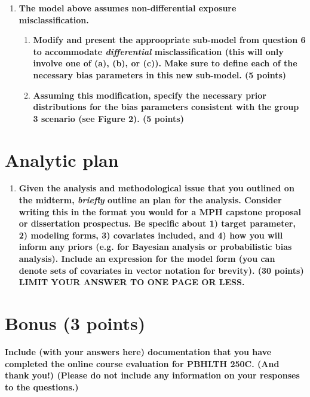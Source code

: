 \documentclass[
  11pt,
]{article}
\begin{document}
\begin{enumerate}[label=\textbf{\arabic*.}]
\newpage

  \item \textbf{The model above assumes non-differential exposure misclassification.}
  \begin{enumerate}[label=\textbf{\alph*.}]
    \item \textbf{Modify and present the approopriate sub-model from question 6 to accommodate \textit{differential} misclassification (this will only involve one of (a), (b), or (c)). Make sure to define each of the necessary bias parameters in this new sub-model. (5 points)}
    \item \textbf{Assuming this modification, specify the necessary prior distributions for the bias parameters consistent with the group 3 scenario (see Figure 2). (5 points)}
  \end{enumerate}
\end{enumerate}

\newpage

\section{Analytic plan}

\begin{enumerate}[label=\textbf{\arabic*.}]\addtocounter{enumi}{8}

  \item \textbf{Given the analysis and methodological issue that you outlined on the midterm, \textit{briefly} outline an plan for the analysis. Consider writing this in the format you would for a MPH capstone proposal or dissertation prospectus. Be specific about 1) target parameter, 2) modeling forms, 3) covariates included, and 4) how you will inform any priors (e.g. for Bayesian analysis or probabilistic bias analysis). Include an expression for the model form (you can denote sets of covariates in vector notation for brevity). (30 points) LIMIT YOUR ANSWER TO ONE PAGE OR LESS.}

\end{enumerate}

\newpage

\hypertarget{bonus-3-points}{%
\section{Bonus (3 points)}\label{bonus-3-points}}

\textbf{Include (with your answers here) documentation that you have completed the online course evaluation for PBHLTH 250C. (And thank you!) (Please do not include any information on your
responses to the questions.)} \color{black}
\end{document}
